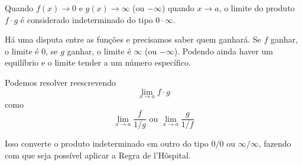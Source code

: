Quando $f(x) \rightarrow 0$ e $g(x) \rightarrow \infty$ (ou $-\infty$) quando $x \rightarrow a$, o limite do produto $f \cdot g$ é considerado indeterminado do tipo $0 \cdot \infty$.
	
Há uma disputa entre as funções e precisamos saber quem ganhará. Se $f$ ganhar, o limite é $0$, se $g$ ganhar, o limite é $\infty$ (ou $-\infty$). Podendo ainda haver um equilíbrio e o limite tender a um número específico.

Podemos resolver reescrevendo $$\lim_{x \to a} f \cdot g$$ como $$\lim_{x \to a} \frac{f}{1/g} \text{ ou } \lim_{x \to a} \frac{g}{1/f}$$

Isso converte o produto indeterminado em outro do tipo $0/0$ ou $\infty/\infty$, fazendo com que seja possível aplicar a Regra de l'Hôspital.